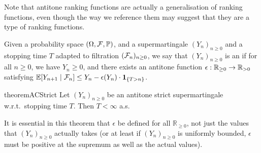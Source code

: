 Note that antitone ranking functions are actually a generalisation of ranking functions, even though the way we reference them may suggest that they are a type of ranking functions.

\iffalse
\lo{An aside: This CBV $\tY$-rule seems cleaner:
\[
\big(\tY f^{A \to B} \, x^A \, . \, \theta^B \big) \, v \to \theta[(\tY f \, x \, . \, \theta) / f, v / x].
\]
We assume $\tY f^{A \to B} \, x^A \, . \, \theta^B$ is a value.}
\fi

\begin{definition}
Given a probability space $(\Omega, \mathcal{F}, \mathbb{P})$, and a supermartingale $(Y_n)_{n \geq 0}$ and a stopping time $T$ adapted to filtration $(\mathcal{F}_n)_{n \geq 0}$,
we say that $(Y_n)_{n \geq 0}$ is an  if for all $n \geq 0$, we have $Y_n \geq 0$, and there exists an antitone function $\epsilon : \mathbb{R}_{{\geq}0} \to \mathbb{R}_{{>}0}$ satisfying
\(
\mathbb{E}[Y_{n+1} \mid \mathcal{F}_n] \leq Y_n - \epsilon (Y_n) \cdot {\bf 1}_{\{T > n\}}
\).
\end{definition}


\begin{restatable}{theorem}{ACStrict}
\label{thm:a-c strict}
Let $(Y_n)_{n \geq 0}$ be an antitone strict supermartingale w.r.t.~stopping time $T$. 
Then $T < \infty$ a.s.
\end{restatable}

It is essential in this theorem that $\epsilon$ be defined for all $\mathbb R_{\geq 0}$, not just the values that $(Y_n)_{n \geq 0}$ actually takes (or at least if $(Y_n)_{n \geq 0}$ is uniformly bounded, $\epsilon$ must be positive at the supremum as well as the actual values). 

